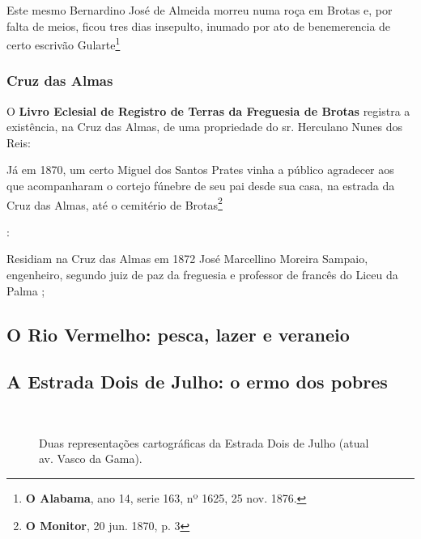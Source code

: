 Este mesmo Bernardino José de Almeida morreu numa roça em Brotas e, por falta de meios, ficou tres dias insepulto, inumado por ato de benemerencia de certo escrivão Gularte\footnote{\textbf{O Alabama}, ano 14, serie 163, nº 1625, 25 nov. 1876.}

\subsubsection{Cruz das Almas}

O \textbf{Livro Eclesial de Registro de Terras da Freguesia de Brotas} registra a existência, na Cruz das Almas, de uma propriedade do sr. Herculano Nunes dos Reis:



Já em 1870, um certo Miguel dos Santos Prates vinha a público agradecer aos que acompanharam o cortejo fúnebre de seu pai desde sua casa, na estrada da Cruz das Almas, até o cemitério de Brotas\footnote{\textbf{O Monitor}, 20 jun. 1870, p. 3}



:



Residiam na Cruz das Almas em 1872 José Marcellino Moreira Sampaio, engenheiro, segundo juiz de paz da freguesia e professor de francês do Liceu da Palma \cite[segunda~parte, pp.~96]{pimenta_almanak_1872}; 

\subsection{O Rio Vermelho: pesca, lazer e veraneio}



\subsection{A Estrada Dois de Julho: o ermo dos pobres}

\begin{figure}[!htp]
\centering
{}
\  %
\caption{Duas representações cartográficas da Estrada Dois de Julho (atual av. Vasco da Gama).}
\end{figure}

